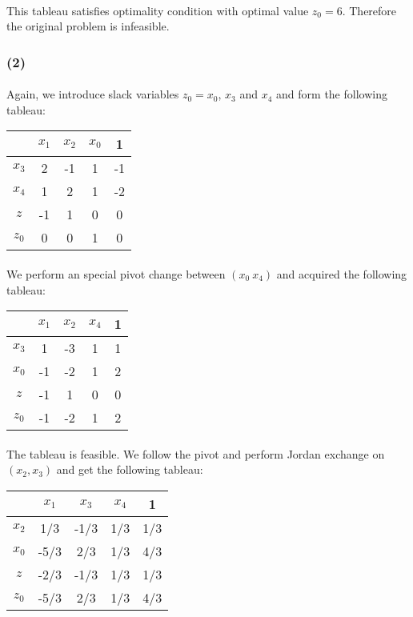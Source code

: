 \paragraph{}
This tableau satisfies optimality condition with optimal value $z_0=6$. Therefore the original problem is infeasible.
\subsubsection*{(2)}
\paragraph{}
Again, we introduce slack variables $z_0 = x_0$, $x_3$ and $x_4$ and form the following tableau:
\begin{center}
	\begin{tabular}{ c | c  c  c | c }
		\      & $x_1$ & $x_2$ & $x_0$ &   1 \\ \hline
		$x_3$  &     2 &    -1 &     1 &  -1 \\ 
		$x_4$  &     1 &     2 &     1 &  -2 \\ \hline
		$z$    &    -1 &     1 &     0 &   0 \\
		$z_0$  &     0 &     0 &     1 &   0 \\ 
	\end{tabular}
\end{center}
\paragraph{}
We perform an special pivot change between $(x_0 \ x_4)$ and acquired the following tableau:
\begin{center}
	\begin{tabular}{ c | c  c  c | c }
		\      & $x_1$ & $x_2$ & $x_4$ &   1 \\ \hline
		$x_3$  &     1 &    -3 &     1 &   1 \\ 
		$x_0$  &    -1 &    -2 &     1 &   2 \\ \hline
		$z$    &    -1 &     1 &     0 &   0 \\
		$z_0$  &    -1 &    -2 &     1 &   2 \\ 
	\end{tabular}
\end{center}
\paragraph{}
The tableau is feasible. We follow the pivot and perform Jordan exchange on $(x_2, x_3)$ and get the following tableau:
\begin{center}
	\begin{tabular}{ c | c  c  c | c }
		\      & $x_1$ & $x_3$ & $x_4$ &   1 \\ \hline
		$x_2$  &   1/3 &  -1/3 &   1/3 & 1/3 \\ 
		$x_0$  &  -5/3 &   2/3 &   1/3 & 4/3 \\ \hline
		$z$    &  -2/3 &  -1/3 &   1/3 & 1/3 \\
		$z_0$  &  -5/3 &   2/3 &   1/3 & 4/3 \\ 
	\end{tabular}
\end{center}
